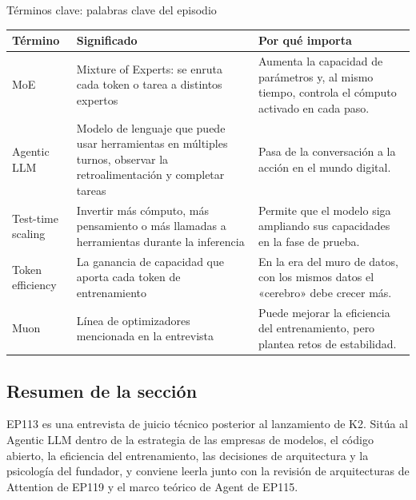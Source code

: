 \begin{knowledgebox}{Términos clave: palabras clave del episodio}
\begin{tabularx}{\textwidth}{p{}p{}X}
\toprule
Término & Significado & Por qué importa \\
\midrule
MoE & Mixture of Experts: se enruta cada token o tarea a distintos expertos & Aumenta la capacidad de parámetros y, al mismo tiempo, controla el cómputo activado en cada paso. \\
Agentic LLM & Modelo de lenguaje que puede usar herramientas en múltiples turnos, observar la retroalimentación y completar tareas & Pasa de la conversación a la acción en el mundo digital. \\
Test-time scaling & Invertir más cómputo, más pensamiento o más llamadas a herramientas durante la inferencia & Permite que el modelo siga ampliando sus capacidades en la fase de prueba. \\
Token efficiency & La ganancia de capacidad que aporta cada token de entrenamiento & En la era del muro de datos, con los mismos datos el «cerebro» debe crecer más. \\
Muon & Línea de optimizadores mencionada en la entrevista & Puede mejorar la eficiencia del entrenamiento, pero plantea retos de estabilidad. \\
\bottomrule
\end{tabularx}
\end{knowledgebox}

\subsection{Resumen de la sección}

EP113 es una entrevista de juicio técnico posterior al lanzamiento de K2. Sitúa al Agentic LLM dentro de la estrategia de las empresas de modelos, el código abierto, la eficiencia del entrenamiento, las decisiones de arquitectura y la psicología del fundador, y conviene leerla junto con la revisión de arquitecturas de Attention de EP119 y el marco teórico de Agent de EP115.
